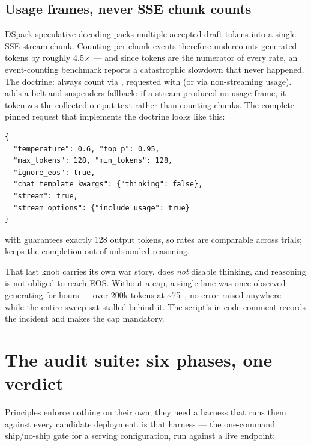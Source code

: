 \subsection{Usage frames, never SSE chunk counts}

DSpark speculative decoding packs multiple accepted draft tokens into a
single SSE stream chunk. Counting per-chunk  events
therefore undercounts generated tokens by roughly 4.5$\times$ --- and since
tokens are the numerator of every rate, an event-counting benchmark reports
a catastrophic slowdown that never happened. The doctrine: always count via
, requested with
 (or via non-streaming usage).
 adds a belt-and-suspenders fallback:
if a stream produced no usage frame, it tokenizes the collected output text
rather than counting chunks. The complete pinned request that implements
the doctrine looks like this:

\begin{lstlisting}[language=jsonhb]
{
  "temperature": 0.6, "top_p": 0.95,
  "max_tokens": 128, "min_tokens": 128,
  "ignore_eos": true,
  "chat_template_kwargs": {"thinking": false},
  "stream": true,
  "stream_options": {"include_usage": true}
}
\end{lstlisting}

\noindent
{} with  guarantees exactly 128
output tokens, so rates are comparable across trials;  keeps the completion out of unbounded reasoning.

That last knob carries its own war story.
 does \emph{not} disable thinking, and
reasoning is not obliged to reach EOS. Without a  cap, a
single lane was once observed generating for hours --- over 200k tokens at
\textasciitilde{}75~\tokspersec{}, no error raised anywhere --- while the entire
sweep sat stalled behind it. The script's in-code comment records the
incident and makes the cap mandatory.

\section{The audit suite: six phases, one verdict}

Principles enforce nothing on their own; they need a harness that runs them
against every candidate deployment.  is that
harness --- the one-command ship/no-ship gate for a serving configuration,
run against a live endpoint:

